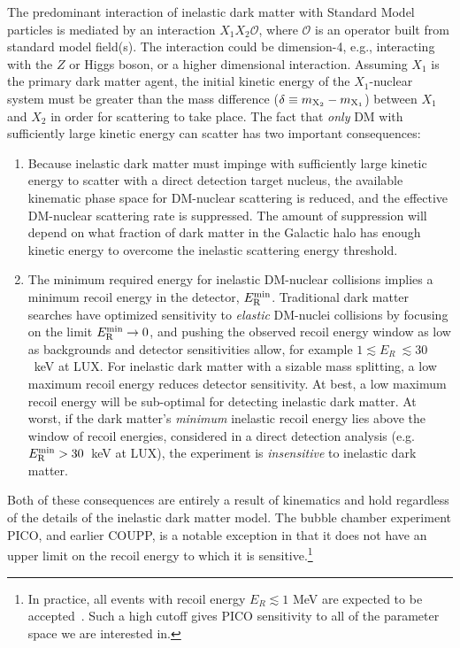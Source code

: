 \documentclass[11pt]{article}
\newcommand{\ltap}{\lesssim}
\begin{document}
The predominant interaction of inelastic dark matter with Standard Model particles is mediated by an interaction $X_1 X_2 \mathcal{O}$, where $\mathcal{O}$ is an operator built from  standard model field(s).  The interaction could be dimension-4, e.g., interacting with the $Z$ or Higgs boson, or a higher dimensional interaction.
Assuming $X_1$ is the primary dark matter agent, the initial kinetic energy of the $X_1$-nuclear system must be greater than the mass difference ($\delta \equiv m_{\rm X_2} - m_{\rm X_1}$) between $X_1$ and $X_2$ in order for scattering to take place. The fact that \emph{only} DM with sufficiently large kinetic energy can scatter has two important consequences:
\begin{enumerate}
\item Because inelastic dark matter must impinge with sufficiently large kinetic energy to scatter with a direct detection target nucleus, the available kinematic phase space for DM-nuclear scattering is reduced, and the effective DM-nuclear scattering rate is suppressed. The amount of suppression will depend on what fraction of dark matter in the Galactic halo has enough kinetic energy to overcome the inelastic scattering energy threshold.
\item The minimum required energy for inelastic DM-nuclear collisions implies a minimum recoil energy in the detector, $E_{\rm R}^{\rm min}$. Traditional dark matter searches have optimized sensitivity to \emph{elastic} DM-nuclei collisions by focusing on the limit $E_{\rm R}^{\rm min} \rightarrow 0$, and pushing the observed recoil energy window as low as backgrounds and detector sensitivities allow, for example $1 \lesssim E_R~ \lesssim 30$~keV at LUX. For inelastic dark matter with a sizable mass splitting, a low maximum recoil energy reduces detector sensitivity. At best, a low maximum recoil energy will be sub-optimal for detecting inelastic dark matter. At worst, if the dark matter's \emph{minimum} inelastic recoil energy lies above the window of recoil energies, considered in a direct detection analysis (e.g. $E_{\rm R}^{\rm min} > 30$~keV at LUX), the experiment is {\em insensitive} to inelastic dark matter.  
\end{enumerate}
Both of these consequences are entirely a result of kinematics and hold regardless of the details of the inelastic dark matter model.  The bubble chamber experiment PICO, and earlier COUPP, is a notable exception in that it does not have an upper limit on the recoil energy to which it is sensitive.\footnote{In practice, all events with recoil energy $E_R\ltap 1$ MeV are expected to be accepted~\cite{privatecomm}.  Such a high cutoff gives PICO sensitivity to all of the parameter space we are interested in.}
\end{document}
